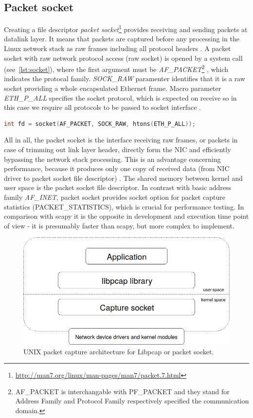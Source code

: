 \documentclass[12pt,a4paper,twoside]{report}
\begin{document}
		\subsection{Packet socket} \label{analysis:mechs:socket}
			Creating a file descriptor \emph{packet socket}\footnote{\url{http://man7.org/linux/man-pages/man7/packet.7.html}} provides receiving and sending packets at datalink layer. It means that packets are captured before any processing in the Linux network stack as raw frames including all protocol headers \cite{man:packet}. A packet socket with raw network protocol access (raw socket) is opened by a system call (see~\autoref{lst:socket}), where the first argument must be \emph{AF\_PACKET}\footnote{AF\_PACKET is interchangable with PF\_PACKET and they stand for Address Family and Protocol Family respectively specified the communication domain.\cite{man:socket}} \cite{man:socket}, which indicates the protocal family. \emph{SOCK\_RAW} paramenter identifies that it is a raw socket providing a whole encapsulated Ethernet frame. Macro parameter \emph{ETH\_P\_ALL} specifies the socket protocol, which is expected on receive so in this case we require all protocols to be passed to socket interface \cite{man:packet}.
			\begin{lstlisting}[language=C, style=appendix, caption=Raw socket system call., label=lst:socket]
int fd = socket(AF_PACKET, SOCK_RAW, htons(ETH_P_ALL));
			\end{lstlisting}
			\par
			All in all, the packet socket is the interface receiving raw frames, or packets in case of trimming out link layer header, directly form the NIC and efficiently bypassing the network stack processing. This is an advantage concerning performance, because it produces only one copy of received data (from NIC driver to packet socket file descriptor) \cite{thesis:muni}\cite{web:raw_socket}. The shared memory between kernel and user space is the packet socket file descriptor. In contrast with basic address family \emph{AF\_INET}, packet socket provides socket option for packet capture statistics (PACKET\_STATISTICS), which is crucial for performance testing. In comparison with scapy it is the opposite in development and execution time point of view - it is presumably faster than scapy, but more complex to implement.\par
			\begin{figure}[h]
				\centering
				\includegraphics[scale=0.4]{linux_net_capture_struct}
				\caption{UNIX packet capture architecture for Libpcap or packet socket.}
				\label{figure:libpcap:struct}
			\end{figure}
\end{document}
